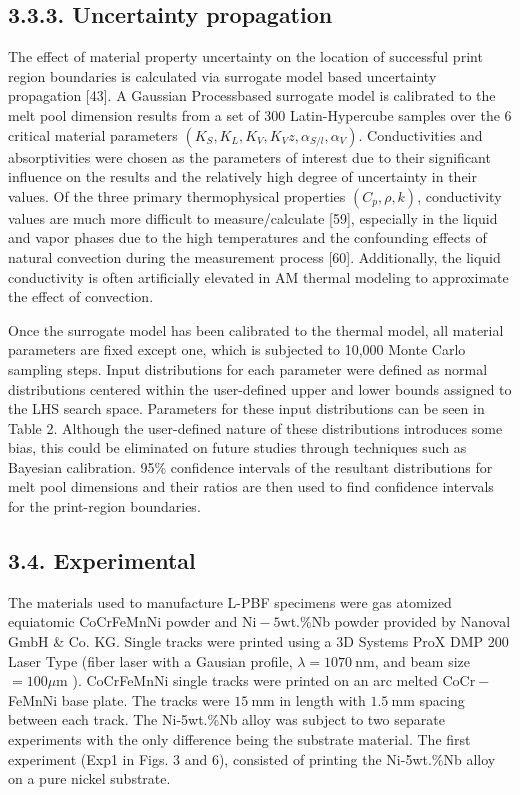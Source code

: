 \documentclass[10pt]{article}
\begin{document}
\subsection*{3.3.3. Uncertainty propagation}
The effect of material property uncertainty on the location of successful print region boundaries is calculated via surrogate model based uncertainty propagation [43]. A Gaussian Processbased surrogate model is calibrated to the melt pool dimension results from a set of 300 Latin-Hypercube samples over the 6 critical material parameters $\left(K_{S}, K_{L}, K_{V}, K_{V} z, \alpha_{S / l}, \alpha_{V}\right)$. Conductivities and absorptivities were chosen as the parameters of interest due to their significant influence on the results and the relatively high degree of uncertainty in their values. Of the three primary thermophysical properties $\left(C_{p}, \rho, k\right)$, conductivity values are much more difficult to measure/calculate [59], especially in the liquid and vapor phases due to the high temperatures and the confounding effects of natural convection during the measurement process [60]. Additionally, the liquid conductivity is often artificially elevated in AM thermal modeling to approximate the effect of convection.

Once the surrogate model has been calibrated to the thermal model, all material parameters are fixed except one, which is subjected to 10,000 Monte Carlo sampling steps. Input distributions for each parameter were defined as normal distributions centered within the user-defined upper and lower bounds assigned to the LHS search space. Parameters for these input distributions can be seen in Table 2. Although the user-defined nature of these distributions introduces some bias, this could be eliminated on future studies through techniques such as Bayesian calibration. 95\% confidence intervals of the resultant distributions for melt pool dimensions and their ratios are then used to find confidence intervals for the print-region boundaries.

\subsection*{3.4. Experimental}
The materials used to manufacture L-PBF specimens were gas atomized equiatomic CoCrFeMnNi powder and $\mathrm{Ni}-5 \mathrm{wt}$.\%Nb powder provided by Nanoval GmbH \& Co. KG. Single tracks were printed using a 3D Systems ProX DMP 200 Laser Type (fiber laser with a Gausian profile, $\lambda=1070 \mathrm{~nm}$, and beam size $=100 \mu \mathrm{m}$ ). CoCrFeMnNi single tracks were printed on an arc melted $\mathrm{CoCr}-$ FeMnNi base plate. The tracks were $15 \mathrm{~mm}$ in length with $1.5 \mathrm{~mm}$ spacing between each track. The Ni-5wt.\%Nb alloy was subject to two separate experiments with the only difference being the substrate material. The first experiment (Exp1 in Figs. 3 and 6), consisted of printing the Ni-5wt.\%Nb alloy on a pure nickel substrate.
\end{document}
